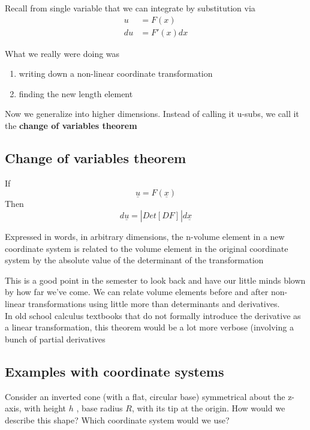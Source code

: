 Recall from single variable that we can integrate by substitution via
\begin{align*}
   u &= F(x) \\
   du &= F'(x) dx
\end{align*}

What we really were doing was
\begin{enumerate}
   \item writing down a non-linear coordinate transformation
   \item finding the new length element
\end{enumerate}

Now we generalize into higher dimensions. Instead of calling it u-subs, we call it the \textbf{change of variables theorem}

\subsection{Change of variables theorem}

\begin{framed}
   If
   \[
     \underline{u} = F( \underline{x})
   \] 
   Then
   \[
     d \underline{u} = \left| Det \left[ D F \right]_{}  \right| d \underline{x}
   \] 

   Expressed in words, in arbitrary dimensions, the n-volume element in a new coordinate system is related to the volume element in the original coordinate system by the absolute value of the determinant of the transformation 
\end{framed}

This is a good point in the semester to look back and have our little minds blown by how far we've come. We can relate volume elements before and after non-linear transformations using little more than determinants and derivatives.  \\

In old school calculus textbooks that do not formally introduce the derivative as a linear transformation, this theorem would be a lot more verbose (involving a bunch of partial derivatives

\subsection{Examples with coordinate systems}

Consider an inverted cone (with a flat, circular base) symmetrical about the z-axis, with height $h$ , base radius $R$, with its tip at the origin. How would we describe this shape? Which coordinate system would we use? \\

